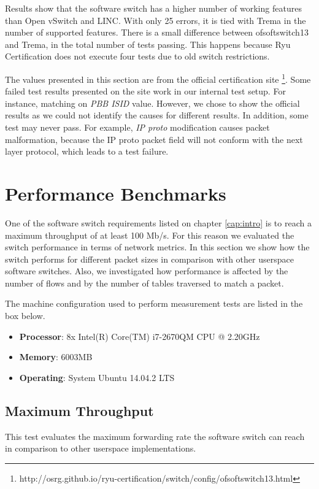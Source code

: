 Results show that the software switch has a higher number of working features than Open vSwitch and LINC. With only 25 errors, it is tied with Trema in the number of supported features. There is a small difference between ofsoftswitch13 and Trema, in the total number of tests passing. This happens because Ryu Certification does not execute four tests due to old switch restrictions.

The values presented in this section are from the official certification site \footnote{http://osrg.github.io/ryu-certification/switch/config/ofsoftswitch13.html}. Some failed test results presented on the site work in our internal test setup. For instance, matching on \textit{PBB ISID} value. However, we chose to show the official results as we could not identify the causes for different results. In addition, some test may never pass. For example, \textit{IP proto} modification causes packet malformation, because the IP proto packet field will not conform with the next layer protocol, which leads to a test failure. 

\section{Performance Benchmarks}

One of the software switch requirements listed on chapter \ref{cap:intro} is to reach a maximum throughput of at least 100 Mb/s. For this reason we evaluated the switch performance in terms of network metrics. In this section we show how the switch performs for different packet sizes in comparison with other userspace software switches. Also, we investigated how performance is affected by the number of flows and by the number of tables traversed to match a packet.  

The machine configuration used to perform measurement tests are listed in the box below. 

\begin{framed}

\begin{itemize}
\item \textbf{Processor}:	8x Intel(R) Core(TM) i7-2670QM CPU @ 2.20GHz
\item \textbf{Memory}:	6003MB 
\item \textbf{Operating}: System	Ubuntu 14.04.2 LTS
\end{itemize}

\end{framed}

    \subsection{Maximum Throughput}
    \label{sec:MaxBand}
    This test evaluates the maximum forwarding rate the software switch can reach in comparison to other userspace implementations. 
    
